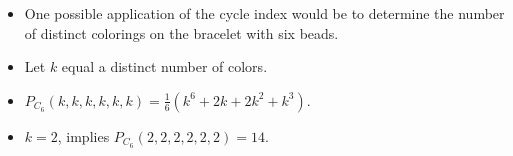 \documentclass{beamer}
\begin{document}

\begin{frame}
\begin{itemize}

\pause
\item One possible application of the cycle index would be to determine the number of distinct colorings on the bracelet with six beads.

\pause
\item Let $k$ equal a distinct number of colors.

\pause
\item $P_{C_{6}}(k,k,k,k,k,k)=\frac{1}{6}(k^{6} + 2k + 2k^{2} + k^{3})$.

\pause
\item $k=2$, implies $P_{C_{6}}(2,2,2,2,2,2) = 14$.


\end{itemize}
\end{frame}

\end{document}
